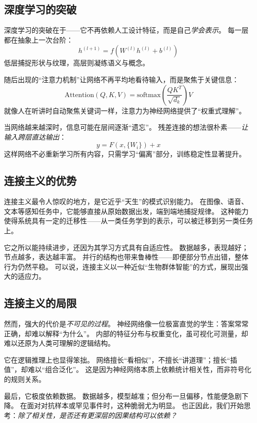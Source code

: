 \subsection{深度学习的突破}

深度学习的突破在于——它不再依赖人工设计特征，而是自己\emph{学会表示}。  
每一层都在抽象上一次台阶：
$$h^{(l+1)} = f\left(W^{(l)} h^{(l)} + b^{(l)}\right)$$
低层捕捉形状与纹理，高层则凝练语义与概念。

随后出现的“注意力机制”让网络不再平均地看待输入，而是聚焦于关键信息：  
$$\text{Attention}(Q, K, V) = \text{softmax}\left(\frac{QK^T}{\sqrt{d_k}}\right)V$$
就像人在听讲时自动聚焦关键词一样，注意力为神经网络提供了“权重式理解”。

当网络越来越深时，信息可能在层间逐渐“遗忘”。  
残差连接的想法很朴素——\emph{让输入跨层直达输出}：
$$y = F(x, \{W_i\}) + x$$
这样网络不必重新学习所有内容，只需学习“偏离”部分，训练稳定性显著提升。

\subsection{连接主义的优势}

连接主义最令人惊叹的地方，是它近乎“天生”的模式识别能力。  
在图像、语音、文本等感知任务中，它能够直接从原始数据出发，端到端地捕捉规律。  
这种能力使得系统具有一定的迁移性——从一类任务学到的表示，可以被迁移到另一类任务上。

它之所以能持续进步，还因为其学习方式具有自适应性。  
数据越多，表现越好；节点越多，表达越丰富。  
并行的结构也带来鲁棒性——即便部分节点出错，整体行为仍然平稳。  
可以说，连接主义以一种近似“生物群体智能”的方式，展现出强大的适应力。

\subsection{连接主义的局限}

然而，强大的代价是\emph{不可见的过程}。  
神经网络像一位极富直觉的学生：答案常常正确，却难以解释“为什么”。  
内部的特征分布与权重变化，虽可视化可测量，却难以还原为人类可理解的逻辑结构。

它在逻辑推理上也显得笨拙。  
网络擅长“看相似”，不擅长“讲道理”；擅长“插值”，却难以“组合泛化”。  
这是因为神经网络本质上依赖统计相关性，而非符号化的规则关系。

最后，它极度依赖数据。  
数据越多，模型越准；但分布一旦偏移，性能便急剧下降。  
在面对对抗样本或罕见事件时，这种脆弱尤为明显。  
也正因此，我们开始思考：\emph{除了相关性，是否还有更深层的因果结构可以依赖？}

